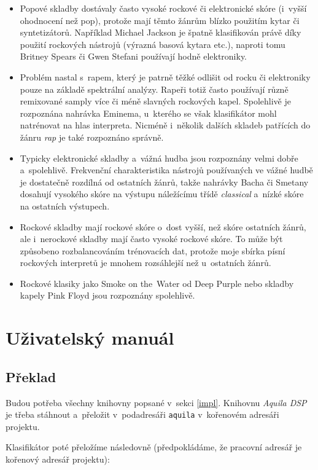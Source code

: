 \documentclass[10pt,a4paper]{article}
\begin{document}
\begin{itemize}
\item Popové skladby dostávaly často vysoké rockové či elektronické skóre (i~vyšší ohodnocení než pop),
protože mají těmto žánrům blízko použitím kytar či syntetizátorů.
Například Michael Jackson je špatně klasifikován právě díky použití rockových nástrojů
(výrazná basová kytara etc.), naproti tomu Britney Spears či Gwen Stefani používají hodně elektroniky.
\item Problém nastal s~rapem, který je patrně těžké odlišit od rocku či elektroniky
pouze na základě spektrální analýzy.
Rapeři totiž často používají různě remixované samply více či méně slavných rockových kapel.
Spolehlivě je rozpoznána nahrávka Eminema,
u~kterého se však klasifikátor mohl natrénovat na hlas interpreta.
Nicméně i~několik dalších skladeb patřících do žánru \emph{rap} je také rozpoznáno správně.
\item Typicky elektronické skladby a~vážná hudba jsou rozpoznány velmi dobře a~spolehlivě.
Frekvenční charakteristika nástrojů používaných ve vážné hudbě je dostatečně rozdílná od
ostatních žánrů, takže nahrávky Bacha či Smetany dosahují vysokého skóre na výstupu
náležícímu třídě \emph{classical} a~nízké skóre na ostatních výstupech.
\item Rockové skladby mají rockové skóre o~dost vyšší, než skóre ostatních žánrů,
ale i~nerockové skladby mají často vysoké rockové skóre.
To může být způsobeno rozbalancováním trénovacích dat,
protože moje sbírka písní rockových interpretů je mnohem rozsáhlejší
než u~ostatních žánrů.
\item Rockové klasiky jako Smoke on the~Water od Deep Purple nebo skladby kapely Pink Floyd
jsou rozpoznány spolehlivě.
\end{itemize}

\section{Uživatelský manuál}

\subsection{Překlad}

Budou potřeba všechny knihovny popsané v~sekci \ref{impl}. Knihovnu \emph{Aquila DSP}
je třeba stáhnout a~přeložit v~pod\-adresáři \verb|aquila| v~kořenovém adresáři projektu.

Klasifikátor poté přeložíme následovně (předpokládáme, že pracovní adresář je kořenový adresář projektu):
\end{document}
